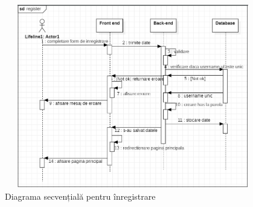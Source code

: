 		\begin{figure}[htbp]
			\centerline{\includegraphics[width=13cm, height=8cm]{figures/sec register.png}}
			\caption{Diagrama secvențială pentru înregistrare}
			\label{fig}
		\end{figure}

